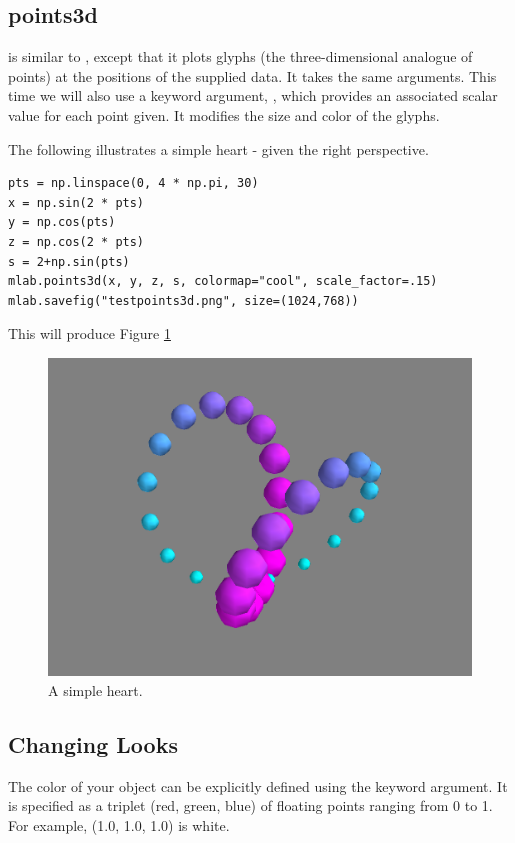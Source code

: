 \subsection*{points3d}
 is similar to , except that it plots glyphs (the three-dimensional analogue of points) at the 
positions of the supplied data. It takes the same arguments. This time we 
will also use a keyword argument, , which provides an associated scalar 
value for each point given. It modifies the size and color of the glyphs. 

The following illustrates a simple heart - given the right perspective. 
\begin{lstlisting}
pts = np.linspace(0, 4 * np.pi, 30)
x = np.sin(2 * pts)
y = np.cos(pts)
z = np.cos(2 * pts)
s = 2+np.sin(pts)
mlab.points3d(x, y, z, s, colormap="cool", scale_factor=.15)
mlab.savefig("testpoints3d.png", size=(1024,768))
\end{lstlisting}
This will produce Figure \ref{fig:points3d}

\begin{figure} 
\includegraphics[width=\textwidth]{points3d.png}
\caption{A simple heart.} 
\label{fig:points3d}
\end{figure}

\subsection*{Changing Looks}
The color of your object can be explicitly defined using the  
keyword argument. It is specified as a triplet (red, green, blue) of 
floating points ranging from 0 to 1. 
For example, (1.0, 1.0, 1.0) is white. 

